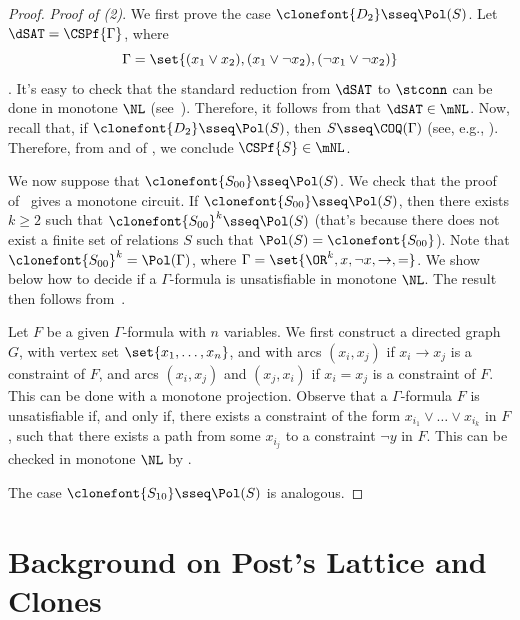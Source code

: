 \documentclass[11pt]{article}
\begin{document}
\begin{proof}
    \emph{Proof of (2)}.
    We first prove the case $\clonefont{D_2} \sseq \Pol(S)$.
    Let $\dSAT = \CSPf{\Gamma}$,
    where \[\Gamma = \set{(x_1 \lor x_2), (x_1 \lor \neg x_2), (\neg x_1 \lor
    \neg x_2)}\].
    It's easy to check that the standard reduction from
    $\dSAT$ to $\stconn$ can be done in monotone $\NL$
    (see~\cite[Theorem 4]{DBLP:journals/mst/JonesLL76}).
    Therefore, it follows from 
    that
    $\dSAT \in \mNL$.
    Now, recall that, if
    $\clonefont{D_2} \sseq \Pol(S)$, then
    $S \sseq \COQ(\Gamma)$
    (see, e.g., \cite[Lemma 4.9]{DBLP:books/daglib/0004131}).
    Therefore,
    from  and
     of ,
    we conclude
    $\CSPf{S} \in \mNL$.

    We now suppose that $\clonefont{S_{00}} \sseq \Pol(S)$.
    We check that the proof of~\cite[Lemma 3.4]{DBLP:journals/jcss/AllenderBISV09}
    gives a monotone circuit.
    If $\clonefont{S_{00}} \sseq \Pol(S)$, then
    there exists $k \geq 2$ such that
    $\clonefont{S_{00}}^k \sseq \Pol(S)$
    (that's because there does not exist a finite set of relations
    $S$ such that $\Pol(S) = \clonefont{S_{00}}$).
    Note that
    $\clonefont{S_{00}}^k = \Pol(\Gamma)$,
    where $\Gamma = \set{\OR^k, x, \neg x, \to, =}$.
    We show below how to decide if a $\Gamma$-formula is unsatisfiable 
    in monotone $\NL$.
    The result then follows from~.

    Let $F$ be a given $\Gamma$-formula with $n$ variables.
    We first construct a directed graph $G$,
    with vertex set $\set{x_1,\dots,x_n}$,
    and with arcs 
    $(x_i,x_j)$
    if $x_i \to x_j$ is a constraint of $F$,
    and 
    arcs
    $(x_i,x_j)$
    and
    $(x_j,x_i)$
    if
    $x_i = x_j$ is a constraint of $F$.
    This can be done with a monotone projection.
    Observe that a $\Gamma$-formula $F$
    is unsatisfiable if, and only if,
    there exists a constraint of the form $x_{i_1} \lor \dots \lor x_{i_k}$ in $F$,
    such that there exists a path from some $x_{i_j}$ to a constraint
    $\neg y$ in $F$.
    This can be checked in monotone $\NL$ by .

    The case $\clonefont{S_{10}} \sseq \Pol(S)$ is analogous.
\end{proof}


\section{Background on Post's Lattice and Clones}
\label{sec:clone-background}
\end{document}
